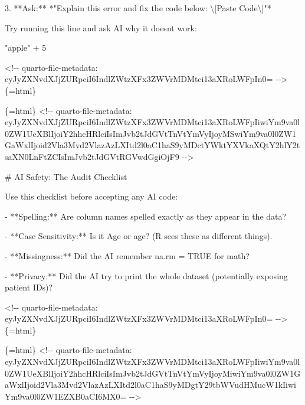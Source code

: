 \documentclass[
  letterpaper,
  DIV=11,
  numbers=noendperiod,
  oneside]{scrreprt}
\newenvironment{Shaded}{\begin{snugshade}}{\end{snugshade}}
\newcommand{\FunctionTok}[1]{\textcolor[rgb]{0.28,0.35,0.67}{#1}}
\newcommand{\InformationTok}[1]{\textcolor[rgb]{0.37,0.37,0.37}{#1}}
\newcommand{\NormalTok}[1]{\textcolor[rgb]{0.00,0.23,0.31}{#1}}
\newcommand{\SpecialStringTok}[1]{\textcolor[rgb]{0.13,0.47,0.30}{#1}}
\begin{document}
\begin{Shaded}
\begin{Highlighting}[numbers=left,,]
\SpecialStringTok{3.  }\NormalTok{**Ask:** *"Explain this error and fix the code below: \textbackslash{}[Paste Code\textbackslash{}]"*}

\NormalTok{Try running this line and ask AI why it doesn\textquotesingle{}t work:}

\InformationTok{\textasciigrave{}\textasciigrave{}\textasciigrave{}         }
\InformationTok{"apple" + 5}
\InformationTok{\textasciigrave{}\textasciigrave{}\textasciigrave{}}


\InformationTok{\textasciigrave{}\textless{}!{-}{-} quarto{-}file{-}metadata: eyJyZXNvdXJjZURpciI6IndlZWtzXFx3ZWVrMDMtci13aXRoLWFpIn0= {-}{-}\textgreater{}\textasciigrave{}}\NormalTok{\{=html\}}

\InformationTok{\textasciigrave{}\textasciigrave{}\textasciigrave{}\{=html\}}
\InformationTok{\textless{}!{-}{-} quarto{-}file{-}metadata: eyJyZXNvdXJjZURpciI6IndlZWtzXFx3ZWVrMDMtci13aXRoLWFpIiwiYm9va0l0ZW1UeXBlIjoiY2hhcHRlciIsImJvb2tJdGVtTnVtYmVyIjoyMSwiYm9va0l0ZW1GaWxlIjoid2Vla3Mvd2VlazAzLXItd2l0aC1haS9yMDctYWktYXVkaXQtY2hlY2tsaXN0LnFtZCIsImJvb2tJdGVtRGVwdGgiOjF9 {-}{-}\textgreater{}}
\InformationTok{\textasciigrave{}\textasciigrave{}\textasciigrave{}}

\FunctionTok{\# AI Safety: The Audit Checklist }


\NormalTok{Use this checklist before accepting any AI code:}

\SpecialStringTok{{-}   }\NormalTok{**Spelling:** Are column names spelled exactly as they appear in the data?}

\SpecialStringTok{{-}   }\NormalTok{**Case Sensitivity:** Is it }\InformationTok{\textasciigrave{}Age\textasciigrave{}}\NormalTok{ or }\InformationTok{\textasciigrave{}age\textasciigrave{}}\NormalTok{? (R sees these as different things).}

\SpecialStringTok{{-}   }\NormalTok{**Missingness:** Did the AI remember }\InformationTok{\textasciigrave{}na.rm = TRUE\textasciigrave{}}\NormalTok{ for math?}

\SpecialStringTok{{-}   }\NormalTok{**Privacy:** Did the AI try to print the whole dataset (potentially exposing patient IDs)?}


\InformationTok{\textasciigrave{}\textless{}!{-}{-} quarto{-}file{-}metadata: eyJyZXNvdXJjZURpciI6IndlZWtzXFx3ZWVrMDMtci13aXRoLWFpIn0= {-}{-}\textgreater{}\textasciigrave{}}\NormalTok{\{=html\}}

\InformationTok{\textasciigrave{}\textasciigrave{}\textasciigrave{}\{=html\}}
\InformationTok{\textless{}!{-}{-} quarto{-}file{-}metadata: eyJyZXNvdXJjZURpciI6IndlZWtzXFx3ZWVrMDMtci13aXRoLWFpIiwiYm9va0l0ZW1UeXBlIjoiY2hhcHRlciIsImJvb2tJdGVtTnVtYmVyIjoyMiwiYm9va0l0ZW1GaWxlIjoid2Vla3Mvd2VlazAzLXItd2l0aC1haS9yMDgtY29tbWVudHMucW1kIiwiYm9va0l0ZW1EZXB0aCI6MX0= {-}{-}\textgreater{}}
\InformationTok{\textasciigrave{}\textasciigrave{}\textasciigrave{}}


\end{Highlighting}
\end{Shaded}
\end{document}
